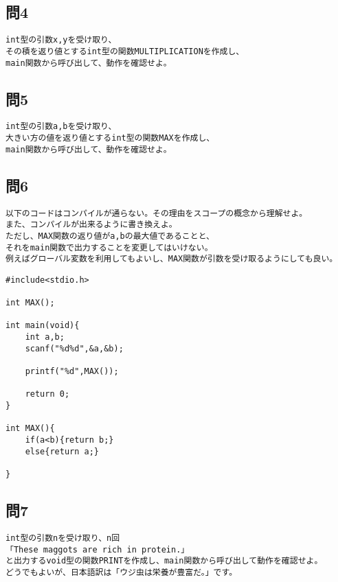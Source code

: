\subsection{問4}
\begin{verbatim}
int型の引数x,yを受け取り、
その積を返り値とするint型の関数MULTIPLICATIONを作成し、
main関数から呼び出して、動作を確認せよ。
\end{verbatim}

\subsection{問5}
\begin{verbatim}
int型の引数a,bを受け取り、
大きい方の値を返り値とするint型の関数MAXを作成し、
main関数から呼び出して、動作を確認せよ。
\end{verbatim}

\subsection{問6}
\begin{verbatim}
以下のコードはコンパイルが通らない。その理由をスコープの概念から理解せよ。
また、コンパイルが出来るように書き換えよ。
ただし、MAX関数の返り値がa,bの最大値であることと、
それをmain関数で出力することを変更してはいけない。
例えばグローバル変数を利用してもよいし、MAX関数が引数を受け取るようにしても良い。
\end{verbatim}

\begin{verbatim}
#include<stdio.h>

int MAX();

int main(void){
	int a,b;
	scanf("%d%d",&a,&b);

	printf("%d",MAX());

	return 0;
}

int MAX(){
	if(a<b){return b;}
	else{return a;}
		
}
\end{verbatim}

\subsection{問7}
\begin{verbatim}
int型の引数nを受け取り、n回
「These maggots are rich in protein.」
と出力するvoid型の関数PRINTを作成し、main関数から呼び出して動作を確認せよ。
どうでもよいが、日本語訳は「ウジ虫は栄養が豊富だ。」です。
\end{verbatim}


